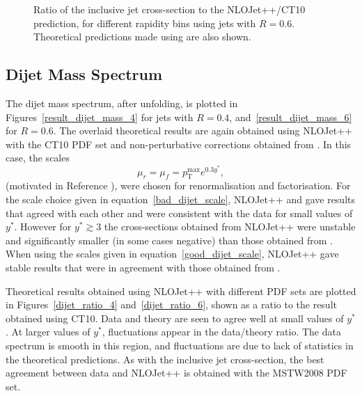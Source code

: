 \begin{figure}[tbp]
\begin{centering}
\caption[Data/theory cross-section ratio, $R$= 0.6]{Ratio of the inclusive jet cross-section to the NLOJet++/CT10 prediction, for different rapidity bins using \akt jets with $R=0.6$. Theoretical predictions made using \powheg are also shown.} 
\label{fig_xsec_rat_akt6p}
\end{centering}
\end{figure}

\clearpage

\subsection{Dijet Mass Spectrum}
\label{dijet_results}
The dijet mass spectrum, after unfolding, is plotted in Figures~\ref{result_dijet_mass_4} for jets with $R=0.4$, and~\ref{result_dijet_mass_6} for $R=0.6$. The overlaid theoretical results are again obtained using NLOJet++ with the CT10 PDF set and non-perturbative corrections obtained from \pythia. In this case, the scales
\begin{equation}
\mu_r = \mu_f = p_\mathrm{T}^\mathrm{max} e^{0.3y^*},
\label{good_dijet_scale}
\end{equation}
(motivated in Reference \cite{dijet_scale_ref}), were chosen for renormalisation and factorisation. For the scale choice given in equation~\ref{bad_dijet_scale}, NLOJet++ and \powheg gave results that agreed with each other and were consistent with the data for small values of $y^*$. However for $y^* \gtrsim 3$ the cross-sections obtained from NLOJet++ were unstable and significantly smaller (in some cases negative) than those obtained from \powheg. When using the scales given in equation~\ref{good_dijet_scale}, NLOJet++ gave stable results that were in agreement with those obtained from \powheg.


Theoretical results obtained using NLOJet++ with different PDF sets are plotted in Figures~\ref{dijet_ratio_4} and~\ref{dijet_ratio_6}, shown as a ratio to the result obtained using CT10. Data and theory are seen to agree well at small values of $y^*$. At larger values of $y^*$, fluctuations appear in the data/theory ratio. The data spectrum is smooth in this region, and fluctuations are due to lack of statistics in the theoretical predictions. As with the inclusive jet cross-section, the best agreement between data and NLOJet++ is obtained with the MSTW2008 PDF set.

